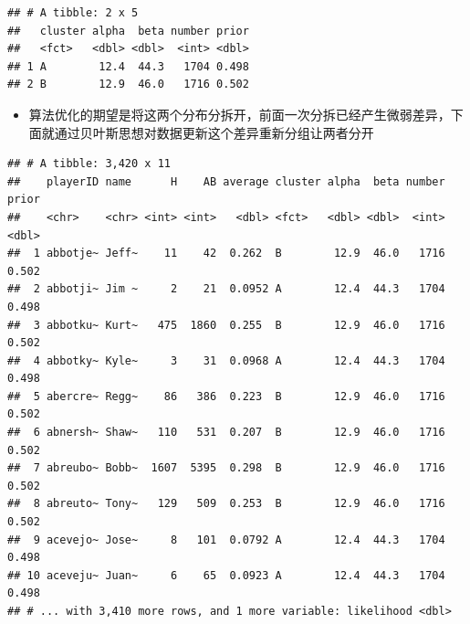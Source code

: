 \documentclass[]{book}
\newenvironment{Shaded}{\begin{snugshade}}{\end{snugshade}}
\newcommand{\CommentTok}[1]{\textcolor[rgb]{0.56,0.35,0.01}{\textit{#1}}}
\newcommand{\DataTypeTok}[1]{\textcolor[rgb]{0.13,0.29,0.53}{#1}}
\newcommand{\DecValTok}[1]{\textcolor[rgb]{0.00,0.00,0.81}{#1}}
\newcommand{\KeywordTok}[1]{\textcolor[rgb]{0.13,0.29,0.53}{\textbf{#1}}}
\newcommand{\NormalTok}[1]{#1}
\newcommand{\OperatorTok}[1]{\textcolor[rgb]{0.81,0.36,0.00}{\textbf{#1}}}
\newcommand{\StringTok}[1]{\textcolor[rgb]{0.31,0.60,0.02}{#1}}
\providecommand{\tightlist}{%
  \setlength{\itemsep}{0pt}\setlength{\parskip}{0pt}}
\begin{document}
\begin{verbatim}
## # A tibble: 2 x 5
##   cluster alpha  beta number prior
##   <fct>   <dbl> <dbl>  <int> <dbl>
## 1 A        12.4  44.3   1704 0.498
## 2 B        12.9  46.0   1716 0.502
\end{verbatim}

\begin{itemize}
\tightlist
\item
  算法优化的期望是将这两个分布分拆开，前面一次分拆已经产生微弱差异，下面就通过贝叶斯思想对数据更新这个差异重新分组让两者分开
\end{itemize}

\begin{Shaded}
\end{Shaded}

\begin{verbatim}
## # A tibble: 3,420 x 11
##    playerID name      H    AB average cluster alpha  beta number prior
##    <chr>    <chr> <int> <int>   <dbl> <fct>   <dbl> <dbl>  <int> <dbl>
##  1 abbotje~ Jeff~    11    42  0.262  B        12.9  46.0   1716 0.502
##  2 abbotji~ Jim ~     2    21  0.0952 A        12.4  44.3   1704 0.498
##  3 abbotku~ Kurt~   475  1860  0.255  B        12.9  46.0   1716 0.502
##  4 abbotky~ Kyle~     3    31  0.0968 A        12.4  44.3   1704 0.498
##  5 abercre~ Regg~    86   386  0.223  B        12.9  46.0   1716 0.502
##  6 abnersh~ Shaw~   110   531  0.207  B        12.9  46.0   1716 0.502
##  7 abreubo~ Bobb~  1607  5395  0.298  B        12.9  46.0   1716 0.502
##  8 abreuto~ Tony~   129   509  0.253  B        12.9  46.0   1716 0.502
##  9 acevejo~ Jose~     8   101  0.0792 A        12.4  44.3   1704 0.498
## 10 aceveju~ Juan~     6    65  0.0923 A        12.4  44.3   1704 0.498
## # ... with 3,410 more rows, and 1 more variable: likelihood <dbl>
\end{verbatim}
\end{document}
